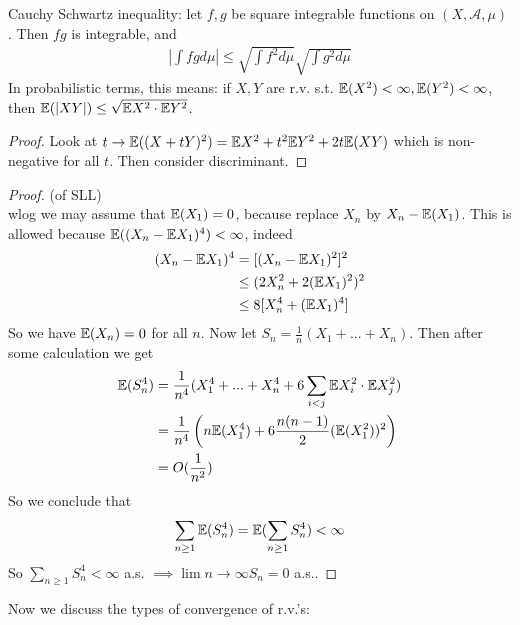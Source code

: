 \documentclass[a4paper]{article}
\begin{document}
Cauchy Schwartz inequality: let $f,g$ be square integrable functions on $(X,\mathcal{A},\mu)$. Then $fg$ is integrable, and
\begin{equation*}
\begin{aligned}
|\int fgd\mu| \leq \sqrt{\int f^2 d\mu} \sqrt{\int g^2 d\mu}
\end{aligned}
\end{equation*}
In probabilistic terms, this means: if $X,Y$ are r.v. s.t. $\mathbb{E}(X^2) < \infty, \mathbb{E}(Y^2)<\infty$, then $\mathbb{E}(|XY|) \leq \sqrt{\mathbb{E} X^2 \cdot \mathbb{E} Y^2}$.
\begin{proof}
Look at $t \to \mathbb{E}((X+tY)^2) = \mathbb{E} X^2 + t^2 \mathbb{E} Y^2 + 2t \mathbb{E}(XY)$ which is non-negative for all $t$. Then consider discriminant.
\end{proof}

\begin{proof} (of SLL)\\
wlog we may assume that $\mathbb{E}(X_1) = 0$, because replace $X_n$ by $X_n - \mathbb{E}(X_1)$. This is allowed because $\mathbb{E}((X_n-\mathbb{E} X_1)^4) < \infty$, indeed
\begin{equation*}
\begin{aligned}
(X_n - \mathbb{E} X_1)^4 &= [(X_n - \mathbb{E} X_1)^2]^2\\
&\leq (2X_n^2 + 2(\mathbb{E} X_1)^2)^2\\
&\leq 8[X_n^4 + (\mathbb{E} X_1)^4]
\end{aligned}
\end{equation*}
So we have $\mathbb{E}(X_n) = 0$ for all $n$. Now let $S_n = \frac{1}{n} (X_1 + ... + X_n)$. Then after some calculation we get
\begin{equation*}
\begin{aligned}
\mathbb{E}(S_n^4) &= \frac{1}{n^4} (X_1^4+...+X_n^4 + 6\sum_{i<j} \mathbb{E} X_i^2 \cdot \mathbb{E} X_j^2)\\
&= \frac{1}{n^4} \left(n \mathbb{E}(X_1^4) + 6 \frac{n(n-1)}{2} (\mathbb{E}(X_1^2))^2\right)\\
&= O(\frac{1}{n^2})
\end{aligned}
\end{equation*}
So we conclude that
\begin{equation*}
\begin{aligned}
\sum_{n \geq 1} \mathbb{E}(S_n^4) = \mathbb{E}(\sum_{n \geq 1} S_n^4) < \infty
\end{aligned}
\end{equation*}
So $\sum_{n \geq 1} S_n^4 < \infty$ a.s. $\implies \lim n\to \infty S_n = 0$ a.s..
\end{proof}

Now we discuss the types of convergence of r.v.'s:
\end{document}
